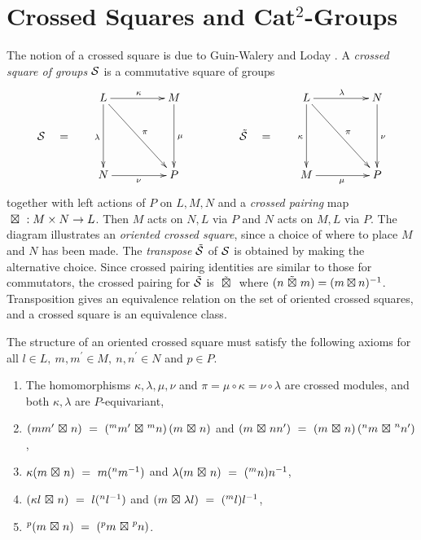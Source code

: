 \documentclass[a4paper,11pt]{article}
\theoremstyle{plain}
\theoremstyle{definition}
\begin{document}
\section{Crossed Squares and Cat$^{2}$-Groups}

The notion of a crossed square is due to Guin-Walery and Loday \cite{walery-loday}. 
A \emph{crossed square of groups} $\mathcal{S}$ is a commutative square of groups 
\begin{equation} \label{xsq-diag}
\xymatrix@R=20pt@C=20pt
{     &  L \ar[dd]_{\lambda} \ar[rr]^{\kappa} \ar[ddrr]^{\pi} 
         &  & M \ar[dd]^{\mu} 
               &  &  &  L \ar[dd]_{\kappa} \ar[rr]^{\lambda} \ar[ddrr]^{\pi} 
                        &  &  N \ar[dd]^{\nu} \\
\calS \quad = 
      &  &  &  &  &  \tilde{\calS} \quad =  \\  
      &  N \ar[rr]_{\nu} 
         &  & P & &  &  M \ar[rr]_{\mu} 
                        &  &  P } 
\end{equation}
\noindent together with left actions of $P$ on $L,M,N$ 
and a \emph{crossed pairing} map ${\ \boxtimes\ } : M \times N \rightarrow L$. 
Then $M$ acts on $N,L$ via $P$ and $N$ acts on $M,L$ via $P$. 
The diagram illustrates an \emph{oriented crossed square}, 
since a choice of where to place $M$ and $N$ has been made. 
The \emph{transpose} $\tilde{\mathcal{S}}$ of $\mathcal{S}$ is obtained by making the alternative choice. 
Since crossed pairing identities are similar to those for commutators, 
the crossed pairing for $\tilde{\mathcal{S}}$ is $\ \tilde{\boxtimes}\ $ 
where $(n \ \tilde{\boxtimes}\  m) = (m \boxtimes n)^{-1}$. 
Transposition gives an equivalence relation on the set of 
oriented crossed squares, and a crossed square is an equivalence class. 

The structure of an oriented crossed square must satisfy the following axioms 
for all $l \in L,~ m,m^{\prime} \in M,~ n,n^{\prime} \in N$ and $p \in P$. 
\begin{enumerate} 
\item 
The homomorphisms $\kappa, \lambda, \mu, \nu$ 
and $\pi = \mu\circ\kappa = \nu\circ\lambda$ are crossed modules, 
and both $\kappa, \lambda$ are $P$-equivariant, 
\item
$(mm^{\prime} {\ \boxtimes\ } n) ~=~ (^{m}m^{\prime} {\ \boxtimes\ } {^{m}n})\,(m {\ \boxtimes\ } n)$  
\quad and \quad 
$(m {\ \boxtimes\ } {nn^{\prime}}) ~=~ (m {\ \boxtimes\ } n)\,(^{n}m {\ \boxtimes\ } ^{n}n^{\prime})$, 
\item 
$\kappa(m {\ \boxtimes\ } n) ~=~ m({}^{n} m^{-1})$ 
\quad and \quad 
$\lambda(m {\ \boxtimes\ } n) ~=~ ({}^{m}n)n^{-1}$, 
\item 
$(\kappa l {\ \boxtimes\ } n) ~=~ l({}^{n} l^{-1})$  
\quad and \quad 
$(m {\ \boxtimes\ } \lambda l) ~=~ ({}^{m}l)l^{-1}$, 
\item 
$^{p}(m {\ \bt\ } n) ~=~ (^{p}m {\ \bt\ } ^{p}n)$. 
\end{enumerate} 
\end{document}
